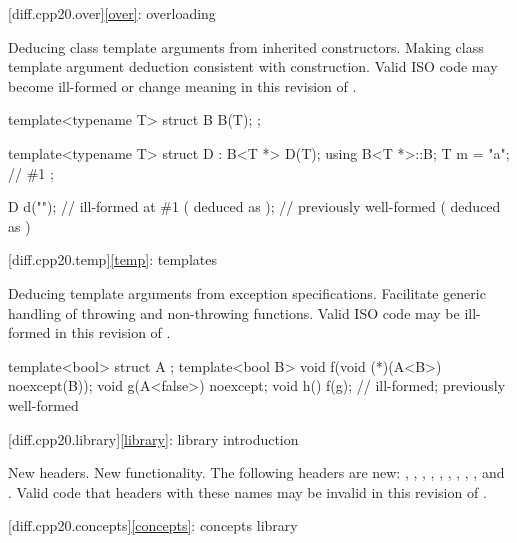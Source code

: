[diff.cpp20.over]{\ref*{over}: overloading}

\change
Deducing class template arguments from inherited constructors.
\rationale
Making class template argument deduction consistent with construction.
\effect
Valid ISO \CppXX{} code may become ill-formed or change meaning
in this revision of \Cpp{}.
\begin{example}
\begin{codeblock}
template<typename T>
struct B {
  B(T);
};

template<typename T>
struct D : B<T *> {
  D(T);
  using B<T *>::B;
  T m = "a";    // \#1
};

D d("");        // ill-formed at \#1 ( deduced as );
                // previously well-formed ( deduced as )
\end{codeblock}
\end{example}

[diff.cpp20.temp]{\ref*{temp}: templates}

\change
Deducing template arguments from exception specifications.
\rationale
Facilitate generic handling of throwing and non-throwing functions.
\effect
Valid ISO \CppXX{} code may be ill-formed in this revision of \Cpp{}.
\begin{example}
\begin{codeblock}
template<bool> struct A { };
template<bool B> void f(void (*)(A<B>) noexcept(B));
void g(A<false>) noexcept;
void h() {
  f(g);                         // ill-formed; previously well-formed
}
\end{codeblock}
\end{example}

[diff.cpp20.library]{\ref*{library}: library introduction}

\change
New headers.
\rationale
New functionality.
\effect
The following \Cpp{} headers are new:
,
,
,
,
,
,
,
,
, and
.
Valid \CppXX{} code that  headers with these names may be
invalid in this revision of \Cpp{}.

[diff.cpp20.concepts]{\ref*{concepts}: concepts library}

